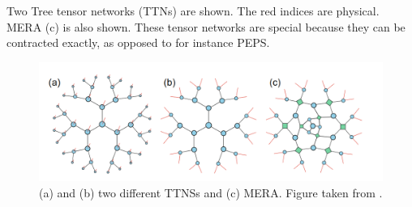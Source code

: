 Two Tree tensor networks (TTNs)  are shown. The red indices are physical. MERA (c) is also shown. These tensor networks are special because they can be contracted exactly, as opposed to for instance PEPS.

\begin{figure}[H]
    \center
    \includegraphics[width=0.8 \textwidth]{Figuren/tnalgs/tnns_and_mera.png}
    \caption{ (a) and (b) two different TTNSs and (c) MERA. Figure taken from \cite{Ran2020}.  }
    \label{fig:tnalgs:ttn_mera}
\end{figure}

